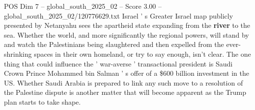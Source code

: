 \begin{textsample}{POS Dim 7 – global\_south\_2025\_02 – Score 3.00 – global\_south\_2025\_02/120776629.txt}
Israel ' s Greater Israel map publicly presented by Netanyahu sees the apartheid state expanding from the \textbf{river} to the sea.
Whether the world, and more significantly the regional powers, will stand by and watch the Palestinians being slaughtered and then expelled from the ever-shrinking spaces in their own homeland, or try to say enough, isn't clear.
The one thing that could influence the ' war-averse ' transactional president is Saudi Crown Prince Mohammed bin Salman ' s offer of a \$600 billion investment in the US.
Whether Saudi Arabia is prepared to link any such move to a resolution of the Palestine dispute is another matter that will become apparent as the Trump plan starts to take shape.

\end{textsample}
